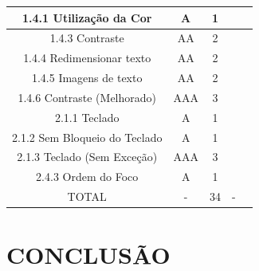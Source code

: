 \documentclass[a4paper]{article}
\begin{document}
\begin{titlepage}
\begin{center}
\begin{longtable}{|c|c|c|c|c|}
		\hline
		1.4.1 Utilização da Cor & A & 1 & & \\
		\hline
		1.4.3 Contraste & AA & 2 & & \\
		\hline
		1.4.4 Redimensionar texto & AA & 2 & & \\
		\hline
		1.4.5 Imagens de texto & AA & 2 & & \\
		\hline
		1.4.6 Contraste (Melhorado) & AAA & 3 & & \\
		\hline
		2.1.1 Teclado & A & 1 & & \\
		\hline
		2.1.2 Sem Bloqueio do Teclado & A & 1 & & \\
		\hline
		2.1.3 Teclado (Sem Exceção) & AAA & 3 & & \\
		\hline
		2.4.3 Ordem do Foco & A & 1 & & \\
		\hline
		TOTAL & - & 34 & - & \\
		\hline
	\end{longtable}
\end{center}

\section{CONCLUSÃO}


\end{titlepage}
\end{document}
